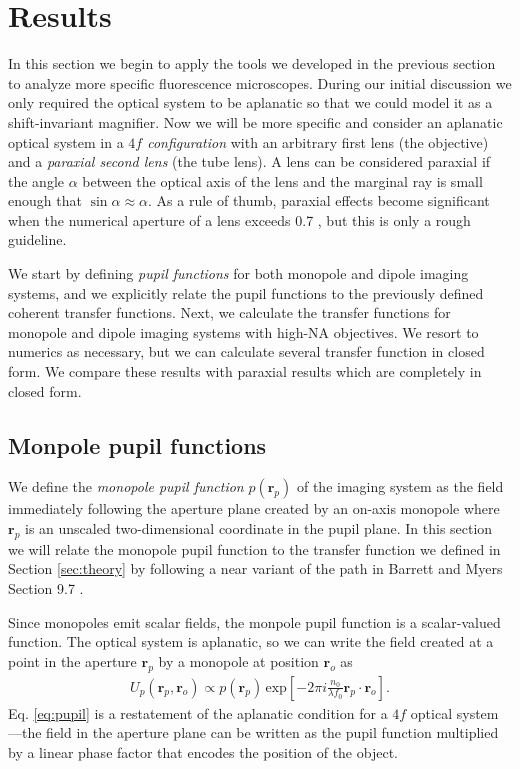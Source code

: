 \documentclass[]{osa-article}
\providecommand{\ro}{\mathbf{\mathbf{r}}_o}
\providecommand{\rp}{\mathbf{r}_p}
\begin{document}
    
\section{Results}\label{sec:results}
In this section we begin to apply the tools we developed in the previous section
to analyze more specific fluorescence microscopes. During our initial discussion
we only required the optical system to be aplanatic so that we could model it as
a shift-invariant magnifier. Now we will be more specific and consider an
aplanatic optical system in a \textit{$4f$ configuration} with an arbitrary
first lens (the objective) and a \textit{paraxial second lens} (the tube lens).
A lens can be considered paraxial if the angle $\alpha$ between the optical axis
of the lens and the marginal ray is small enough that
$\sin\alpha \approx \alpha$. As a rule of thumb, paraxial effects become
significant when the numerical aperture of a lens exceeds 0.7 \cite{gu2000}, but
this is only a rough guideline.

We start by defining \textit{pupil functions} for both monopole and dipole
imaging systems, and we explicitly relate the pupil functions to the previously
defined coherent transfer functions. Next, we calculate the transfer functions
for monopole and dipole imaging systems with high-NA objectives. We resort to
numerics as necessary, but we can calculate several transfer function in closed
form. We compare these results with paraxial results which are completely in
closed form.

\subsection{Monpole pupil functions}
We define the \textit{monopole pupil function} $p(\rp)$ of the imaging system as
the field immediately following the aperture plane created by an on-axis
monopole where $\rp$ is an unscaled two-dimensional coordinate in the pupil
plane. In this section we will relate the monopole pupil function to the
transfer function we defined in Section \ref{sec:theory} by following a near
variant of the path in Barrett and Myers Section 9.7 \cite{barrett2004}.

Since monopoles emit scalar fields, the monpole pupil function is a
scalar-valued function. The optical system is aplanatic, so we can write the
field created at a point in the aperture $\rp$ by a monopole at position $\ro$
as
\begin{align}
   U_p(\rp, \ro) \propto p(\rp)\,\text{exp}\left[-2\pi i \frac{n_0}{\lambda f_0} \rp\cdot\ro \right]. \label{eq:pupil}
\end{align}
Eq. \ref{eq:pupil} is a restatement of the aplanatic condition for a $4f$
optical system---the field in the aperture plane can be written as the pupil
function multiplied by a linear phase factor that encodes the position of the
object.
\end{document}
